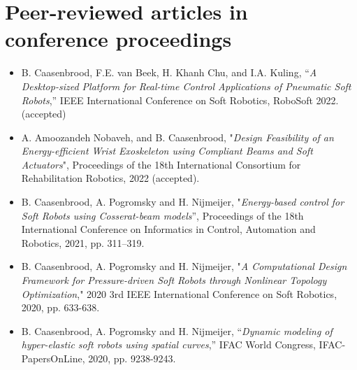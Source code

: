 \section*{Peer-reviewed articles in conference proceedings}
\begin{itemize}[leftmargin=4mm]
\item B. Caasenbrood, F.E. van Beek, H. Khanh Chu, and I.A. Kuling, “\textit{A Desktop-sized Platform for Real-time Control Applications of Pneumatic Soft Robots},” IEEE International Conference on Soft Robotics, RoboSoft 2022. (accepted)
\item A. Amoozandeh Nobaveh, and B. Caasenbrood, "\textit{Design Feasibility of an Energy-efficient Wrist Exoskeleton
using Compliant Beams and Soft Actuators}", Proceedings of the 18th International  Consortium for Rehabilitation Robotics, 2022 (accepted).
\item B. Caasenbrood, A. Pogromsky and H. Nijmeijer, "\textit{Energy-based control for Soft Robots using Cosserat-beam models}”, Proceedings of the 18th International Conference on Informatics in Control, Automation and Robotics, 2021, pp. 311–319.
\item B. Caasenbrood, A. Pogromsky and H. Nijmeijer, "\textit{A Computational Design Framework for Pressure-driven Soft Robots through Nonlinear Topology Optimization}," 2020 3rd IEEE International Conference on Soft Robotics, 2020, pp. 633-638.
\item B. Caasenbrood, A. Pogromsky and H. Nijmeijer, “\textit{Dynamic modeling of hyper-elastic soft robots using spatial curves},” IFAC World Congress, IFAC-PapersOnLine, 2020, pp. 9238-9243.
\end{itemize}

